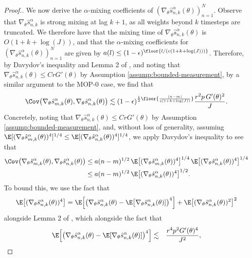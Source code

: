 \begin{proof}[Proof.]
We now derive the $\alpha$-mixing coefficients of $(\nabla_\theta \hat s_{n,k}^\alpha(\theta))_{n=1}^N$. Observe that $\nabla_\theta \hat s_{n,k}^\alpha$ is strong mixing at lag $k+1$, as all weights beyond $k$ timesteps are truncated. We therefore have that the mixing time of $\nabla_\theta \hat s_{n,k}^\alpha(\theta)$ is $O(1+k+\log(J))$, and that the $\alpha$-mixing coefficients for $(\nabla_\theta \hat s_{n,k}^\alpha(\theta))_{n=1}^N$ are given by $a(l) \leq (1-\epsilon)^{\floor{l/(c(1+k+\log(J)))}}$.
Therefore, by Davydov's inequality and Lemma 2 of \cite{karjalainen23}, and noting that $\nabla_\theta \hat s_{n,k}^\alpha(\theta) \leq CrG'(\theta)$ by Assumption \ref{assump:bounded-measurement}, by a similar argument to the MOP-0 case, we find that 
\begin{equation}
\Cov\big(\nabla_\theta \hat s_{m,k}^\alpha(\theta), \nabla_\theta \hat s_{n,k}^\alpha(\theta)\big) \lesssim (1-\epsilon)^{\frac{1}{2}\floor{\frac{|n-m|}{c(1+k+\log(J))}}}\frac{r^2p \, G'(\theta)^2}{J}.
\end{equation}
Concretely, noting that $\nabla_\theta\hat s_{n,k}^\alpha(\theta)\leq CrG'(\theta)$ by Assumption \ref{assump:bounded-measurement}, and, without loss of generality, assuming $\E[(\nabla_\theta\hat s_{m,k}^\alpha(\theta))^4]^{1/4}\leq\E[(\nabla_\theta\hat s_{n,k}^\alpha(\theta))^4]^{1/4}$, we apply Davydov's inequality to see that
\begin{align}
    \Cov\big(\nabla_\theta\hat s_{m,k}^\alpha(\theta), \nabla_\theta\hat s_{n,k}^\alpha(\theta)\big) 
    &\leq a(n-m)^{1/2} \, \E\big[(\nabla_\theta\hat s_{m,k}^\alpha(\theta))^4\big]^{1/4} \, \E\big[(\nabla_\theta\hat s_{n,k}^\alpha(\theta))^4\big]^{1/4}\\
    &\leq a(n-m)^{1/2} \, \E\big[(\nabla_\theta\hat s_{n,k}^\alpha(\theta))^4\big]^{1/2}.
\end{align}
To bound this, we use the fact that 
\begin{equation}
\E\big[(\nabla_\theta\hat s_{n,k}^\alpha(\theta))^4\big] = \E\Big[\big(\nabla_\theta\hat s_{n,k}^\alpha(\theta)-\E\big[\nabla_\theta\hat s_{n,k}^\alpha(\theta)]\big)^4\Big]+\E\big[(\nabla_\theta\hat s_{n,k}^\alpha(\theta))^2\big]^2
\end{equation}
alongside Lemma 2 of \cite{karjalainen23}, which alongside the fact that
\begin{eqnarray}
\E\Big[\big(\nabla_\theta\hat s_{n,k}^\alpha(\theta)-\E[\nabla_\theta\hat s_{n,k}^\alpha(\theta)]\big)^4\Big] &\lesssim& \frac{r^4p^2G'(\theta)^4}{J^2}, 
\\

\end{eqnarray}
\end{proof}
